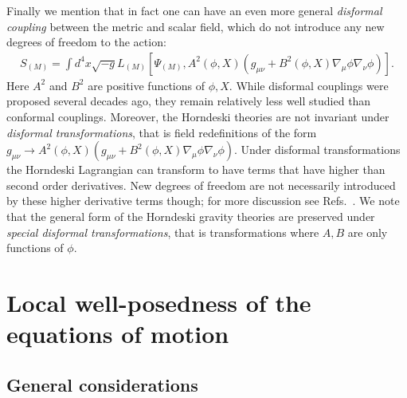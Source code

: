 \documentclass{ws-ijmpd}
\begin{document}
Finally we mention that in fact one can have an even more general
\emph{disformal coupling} between the metric and 
scalar field\cite{Bekenstein:1992pj}, which do not introduce
any new degrees of freedom to the action:
\begin{align}
   S_{(M)}
   =
   \int d^4x\sqrt{-g}L_{(M)}\left[
      \Psi_{(M)},A^2\left(\phi,X\right)
      \left(
         g_{\mu\nu}
         +
         B^2\left(\phi,X\right)\nabla_{\mu}\phi\nabla_{\nu}\phi
      \right)
   \right]
   .
\end{align}
Here $A^2$ and $B^2$ are positive functions of $\phi,X$.
While disformal couplings were proposed several decades 
ago\cite{Bekenstein:1992pj}, they remain relatively less well studied
than conformal couplings.
Moreover, the Horndeski theories are not invariant under \emph{disformal
transformations}, that is field redefinitions of the form 
$g_{\mu\nu}\to
      A^2\left(\phi,X\right)
      \left(
         g_{\mu\nu}
         +
         B^2\left(\phi,X\right)\nabla_{\mu}\phi\nabla_{\nu}\phi
      \right)$.
Under disformal transformations the Horndeski Lagrangian can transform
to have terms that have higher than second order derivatives.
New degrees of freedom are not necessarily introduced by these
higher derivative terms though; 
for more discussion see 
Refs.~.
We note that
the general form of the Horndeski gravity theories are preserved under
\emph{special disformal transformations}, that is transformations
where $A,B$ are only functions of $\phi$\cite{Bettoni:2013diz}.
\section{Local well-posedness of the equations of motion
\label{sec:local_well_posedness}
}
\subsection{General considerations\label{sec:general_considerations}}
	
\end{document}
